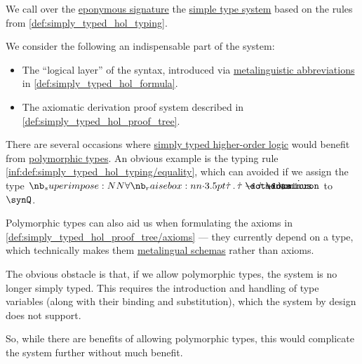 \begin{definition}\label{def:simply_typed_hol}
  We call  over the \hyperref[def:simply_typed_hol_signature]{eponymous signature} the \hyperref[def:simple_type_system]{simple type system} based on the rules from \cref{def:simply_typed_hol_typing}.
\end{definition}
\begin{comments}
  \item We consider the following an indispensable part of the system:
  \begin{itemize}
    \item The \enquote{logical layer} of the syntax, introduced via \hyperref[con:metalingual_abbreviation]{metalinguistic abbreviations} in \cref{def:simply_typed_hol_formula}.
    \item The axiomatic derivation proof system described in \cref{def:simply_typed_hol_proof_tree}.
  \end{itemize}
\end{comments}

\begin{remark}\label{rem:simply_typed_hol_polymorphic_types}
  There are several occasions where \hyperref[def:simply_typed_hol]{simply typed higher-order logic} would benefit from \hyperref[def:polymorphic_typed_lambda_calculus]{polymorphic types}. An obvious example is the typing rule \ref{inf:def:simply_typed_hol_typing/equality}, which can avoided if we assign the type \( \qpolytype {\syn\tau} \syn\tau \synimplies \syn\tau \synimplies \syn\omicron \) to \( \synQ \).

  Polymorphic types can also aid us when formulating the axioms in \ref{def:simply_typed_hol_proof_tree/axioms} --- they currently depend on a type, which technically makes them \hyperref[con:schemas_and_instances]{metalingual schemas} rather than axioms.

  The obvious obstacle is that, if we allow polymorphic types, the system is no longer simply typed. This requires the introduction and handling of type variables (along with their binding and substitution), which the system by design does not support.

  So, while there are benefits of allowing polymorphic types, this would complicate the system further without much benefit.
\end{remark}

